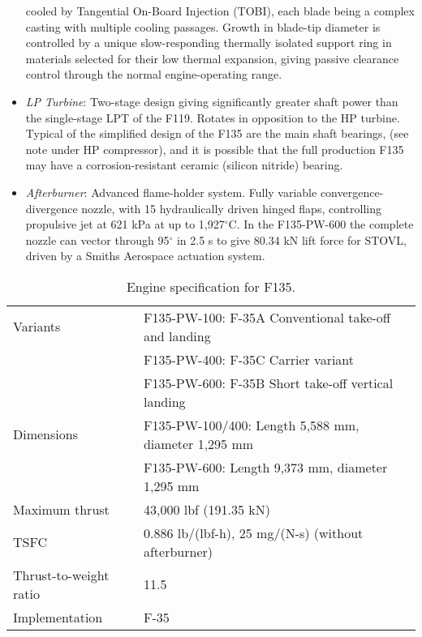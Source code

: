 \begin{itemize}[noitemsep=2pt,topsep=0pt]
cooled by Tangential On-Board Injection (TOBI), each blade being a complex casting with multiple cooling passages. Growth in blade-tip diameter is controlled by a unique slow-responding thermally isolated support ring in materials selected for their low thermal expansion, giving passive clearance control through the normal engine-operating range.
 \item {\it  LP Turbine}: Two-stage design giving significantly greater shaft power than the single-stage LPT of the F119. Rotates in opposition to the HP turbine. Typical of the simplified design of the F135 are the main shaft bearings, (see note under HP compressor), and it is possible that the full production F135 may have a corrosion-resistant ceramic (silicon nitride) bearing.
 \item {\it  Afterburner}: Advanced flame-holder system. Fully variable convergence-divergence nozzle, with 15 hydraulically driven hinged flaps, controlling propulsive jet at 621 kPa at up to 1,927$^\circ$C. In the F135-PW-600 the complete nozzle can vector through 95$^\circ$ in 2.5 s to give 80.34 kN lift force for STOVL, driven by a Smiths Aerospace actuation system.
\end{itemize}

\begin{table}[!htb!]
  \centering
\begin{tabular}{|p{}|p{}|}\hline
Variants & F135-PW-100: F-35A Conventional take-off and landing\\
         & F135-PW-400: F-35C Carrier variant\\
         & F135-PW-600: F-35B Short take-off vertical landing\\
Dimensions & F135-PW-100/400: Length 5,588 mm, diameter 1,295 mm\\
           & F135-PW-600: Length 9,373 mm, diameter 1,295 mm\\
Maximum thrust &43,000 lbf (191.35 kN)\\
TSFC& 0.886 lb/(lbf-h), 25 mg/(N-s) (without afterburner)\\
Thrust-to-weight ratio& 11.5\\
Implementation & F-35\\\hline
\end{tabular}
  \caption{\label{TAB_F135}Engine specification for F135.}
\end{table}

